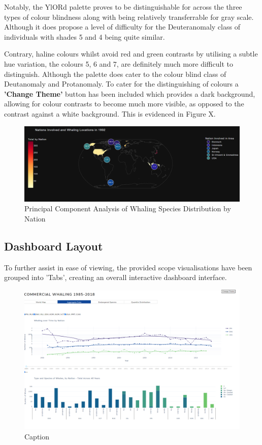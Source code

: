 \documentclass[12pt,a4paper]{article}
\begin{document}
Notably, the YlORd palette proves to be distinguishable for across the three types of colour blindness along with being relatively transferrable for gray scale. Although it does propose a level of difficulty for the Deuteranomaly class of individuals with shades 5 and 4 being quite similar. 

Contrary, haline colours whilst avoid red and green contrasts by utilising a subtle hue variation, the colours 5, 6 and 7, are definitely much more difficult to distinguish. Although the palette does cater to the colour blind class of Deutanomaly and Protanomaly. To cater for the distinguishing of colours a \textbf{'Change Theme'} button has been included which provides a dark background, allowing for colour contrasts to become much more visible, as opposed to the contrast against a white background. This is evidenced in Figure X. 

\begin{figure}[H]
    \centering
    \includegraphics[width = 12cm]{ChoroDark.png}
    \caption{Principal Component Analysis of Whaling Species Distribution by Nation}
    \label{fig:my_label}
\end{figure}

\subsection{Dashboard Layout}
To further assist in ease of viewing, the provided scope visualisations have been grouped into 'Tabs', creating an overall interactive dashboard interface.

\begin{figure}[H]
    \centering
    \includegraphics[width = 14cm]{DashboardLayout.png}
    \caption{Caption}
    \label{fig:my_label}
\end{figure}
\end{document}
